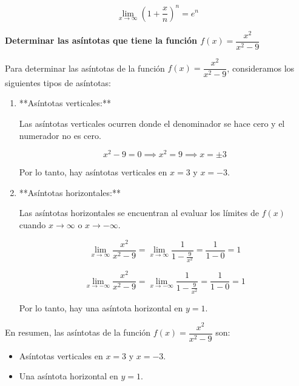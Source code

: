\documentclass[answers]{exam} %
\begin{document}
\begin{questions}
\begin{solution}
\begin{enumerate}[label=\alph*.]
            \[
            \lim_{x \to \infty} \left(1 + \frac{x}{n}\right)^n = e^n
            \]
        \end{enumerate}
    \end{solution}
    

    \vspace{0.5cm}
    \question \large\textbf{Determinar las asíntotas que tiene la función \(f(x)=\dfrac{x^2}{x^2-9}\)}
    \begin{solution}
        Para determinar las asíntotas de la función \( f(x) = \dfrac{x^2}{x^2 - 9} \), consideramos los siguientes tipos de asíntotas:
    
        \begin{enumerate}
            \item **Asíntotas verticales:**
    
            Las asíntotas verticales ocurren donde el denominador se hace cero y el numerador no es cero.
    
            \[
            x^2 - 9 = 0 \implies x^2 = 9 \implies x = \pm 3
            \]
    
            Por lo tanto, hay asíntotas verticales en \( x = 3 \) y \( x = -3 \).
    
            \item **Asíntotas horizontales:**
    
            Las asíntotas horizontales se encuentran al evaluar los límites de \( f(x) \) cuando \( x \to \infty \) o \( x \to -\infty \).
    
            \[
            \lim_{x \to \infty} \dfrac{x^2}{x^2 - 9} = \lim_{x \to \infty} \dfrac{1}{1 - \frac{9}{x^2}} = \dfrac{1}{1 - 0} = 1
            \]
    
            \[
            \lim_{x \to -\infty} \dfrac{x^2}{x^2 - 9} = \lim_{x \to -\infty} \dfrac{1}{1 - \frac{9}{x^2}} = \dfrac{1}{1 - 0} = 1
            \]
    
            Por lo tanto, hay una asíntota horizontal en \( y = 1 \).
        \end{enumerate}
    
        En resumen, las asíntotas de la función \( f(x) = \dfrac{x^2}{x^2 - 9} \) son:
    
        \begin{itemize}
            \item Asíntotas verticales en \( x = 3 \) y \( x = -3 \).
            \item Una asíntota horizontal en \( y = 1 \).
        \end{itemize}
    \end{solution}
    


\end{questions}
\end{document}
